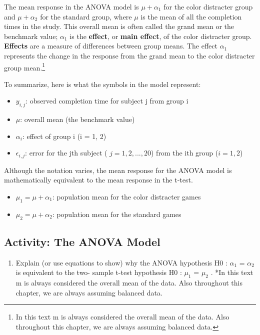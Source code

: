 \documentclass[
]{book}
\providecommand{\tightlist}{%
  \setlength{\itemsep}{0pt}\setlength{\parskip}{0pt}}
\begin{document}
The mean response in the ANOVA model is \(\mu + \alpha_1\) for the color distracter group and \(\mu + \alpha_2\) for the standard group, where \(\mu\) is the mean of all the completion times in the study. This overall mean is often called the grand mean or the benchmark value; \(\alpha_1\) is the \textbf{effect}, or \textbf{main effect}, of the color distracter group. \textbf{Effects} are a measure of differences between group means. The effect \(\alpha_1\) represents the change in the response from the grand mean to the color distracter group mean.\footnote{In this text m is always considered the overall mean of the data. Also throughout this chapter, we are always assuming balanced data.}

To summarize, here is what the symbols in the model represent:

\begin{itemize}
\tightlist
\item
  \(y_{i,j}\): observed completion time for subject j from group i
\item
  \(\mu\): overall mean (the benchmark value)
\item
  \(\alpha_i\): effect of group i (i = 1, 2)
\item
  \(\epsilon_{i,j}\): error for the jth subject ( \(j = 1, 2, ... , 20\)) from the ith group (\(i = 1, 2\))
\end{itemize}

Although the notation varies, the mean response for the ANOVA model is mathematically equivalent to the mean response in the t-test.

\begin{itemize}
\tightlist
\item
  \(\mu_1 = \mu + \alpha_1\): population mean for the color distracter games
\item
  \(\mu_2 = \mu + \alpha_2\): population mean for the standard games
\end{itemize}

\hypertarget{activity-the-anova-model}{%
\subsection*{Activity: The ANOVA Model}\label{activity-the-anova-model}}

\begin{enumerate}
\def\labelenumi{\arabic{enumi}.}
\setcounter{enumi}{15}
\tightlist
\item
  Explain (or use equations to show) why the ANOVA hypothesis H0 : \(\alpha_1\) = \(\alpha_2\) is equivalent to the two- sample t-test hypothesis H0 : \(\mu_1\) = \(\mu_2\) .
  *In this text m is always considered the overall mean of the data. Also throughout this chapter, we are always assuming balanced data.
\end{enumerate}
\end{document}

